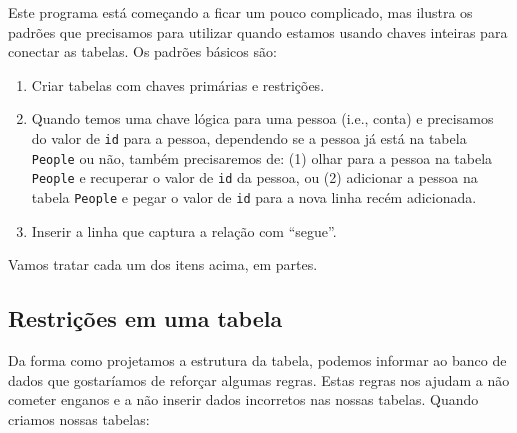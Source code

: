 %
Este programa está começando a ficar um pouco complicado, mas ilustra os
padrões que precisamos para utilizar quando estamos usando chaves inteiras
para conectar as tabelas. Os padrões básicos são:

\begin{enumerate}

\item Criar tabelas com chaves primárias e restrições.
\item Quando temos uma chave lógica para uma pessoa (i.e., conta) e precisamos
  do valor de {\tt id} para a pessoa, dependendo se a pessoa já está na tabela
  {\tt People}  ou não, também precisaremos de: (1) olhar para a pessoa na
  tabela {\tt People} e recuperar o valor de {\tt id} da pessoa, ou (2)
  adicionar a pessoa na tabela {\tt People} e pegar o valor de {\tt id} para
  a nova linha recém adicionada.
  

\item Inserir a linha que captura a relação com ``segue''.
  
\end{enumerate}

Vamos tratar cada um dos itens acima, em partes.

\subsection{Restrições em uma tabela}

Da forma como projetamos a estrutura da tabela, podemos informar ao banco de dados
que gostaríamos de reforçar algumas regras. Estas regras nos ajudam a não
cometer enganos e a não inserir dados incorretos nas nossas tabelas. Quando
criamos nossas tabelas:


